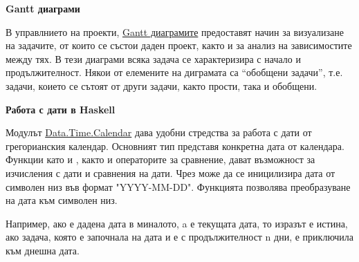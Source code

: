 \begin{mdframed}[hidealllines=true,backgroundcolor=gray!20]
\textbf{Gantt диаграми}

В управлнието на проекти, \href{https://en.wikipedia.org/wiki/Gantt_chart}{Gantt диаграмите} предоставят начин за визуализане на задачите, от които се състои даден проект, както и за анализ на зависимостите между тях. В тези диаграми всяка задача се характеризира с начало и продължителност. Някои от елемените на диграмата са ``обобщени задачи'', т.е. задачи, коието се сътоят от други задачи, както прости, така и обобщени.
\end{mdframed}

\begin{mdframed}[hidealllines=true,backgroundcolor=gray!20]
\textbf{Работа с дати в Haskell}

Модулът \href{https://hackage.haskell.org/package/time-1.14/docs/Data-Time-Calendar.html}{Data.Time.Calendar} дава удобни стредства за работа с дати от грегорианския календар. Основният тип  представя конкретна дата от календара. Функции като  и , както и операторите за сравнение, дават възможност за изчисления с дати и сравнения на дати. Чрез  може да се иницилизира дата от символен низ във формат "YYYY-MM-DD". Функцията  позволява преобразуване на дата към символен низ.


Например, ако  е дадена дата в миналото, a  е текущата дата, то изразът  е истина, ако задача, която е започнала на дата  и е с продължителност n дни, е приключила към днешна дата.

\end{mdframed}

